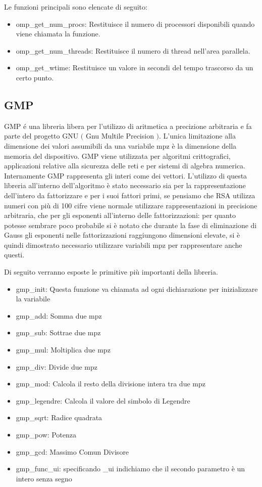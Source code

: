 Le funzioni principali sono elencate di seguito:
\begin{itemize}
\item omp\_get\_num\_procs: Restituisce il numero di processori disponibili quando viene chiamata la funzione. 
\item omp\_get\_num\_threads: Restituisce il numero di thread nell'area parallela.
\item omp\_get\_wtime: Restituisce un valore in secondi del tempo trascorso da un certo punto. 
\end{itemize}

\subsection{GMP}
\label{subsec:gmp}
GMP \'{e} una libreria libera per l'utilizzo di aritmetica a precizione arbitraria e fa parte
del progetto GNU $($ Gnu Multile Precision $)$.
L'unica limitazione alla dimensione dei valori assumibili da una variabile mpz è la dimensione della
memoria del dispositivo.
GMP viene utilizzata per algoritmi crittografici, applicazioni relative alla sicurezza delle reti
e per sistemi di algebra numerica.
Internamente GMP rappresenta gli interi come dei vettori.
L'utilizzo di questa libreria all'interno dell'algoritmo è stato necessario sia per la rappresentazione
dell'intero da fattorizzare e per i suoi fattori primi, se pensiamo che RSA utilizza numeri con più
di 100 cifre viene normale utilizzare rappresentazioni in precisione arbitraria, che per gli esponenti
all'interno delle fattorizzazioni: per quanto potesse sembrare poco probabile si è notato che durante la fase di eliminazione di Gauss gli esponenti nelle fattorizzazioni raggiungono dimensioni elevate, si è quindi dimostrato necessario utilizzare variabili
mpz per rappresentare anche questi.

Di seguito verranno esposte le primitive più importanti della libreria.
\begin{itemize}
\item gmp\_init: Questa funzione va chiamata ad ogni dichiarazione per inizializzare la variabile
\item gmp\_add: Somma due mpz
\item gmp\_sub: Sottrae due mpz
\item gmp\_mul: Moltiplica due mpz
\item gmp\_div: Divide due mpz
\item gmp\_mod: Calcola il resto della divisione intera tra due mpz
\item gmp\_legendre: Calcola il valore del simbolo di Legendre
\item gmp\_sqrt: Radice quadrata
\item gmp\_pow: Potenza
\item gmp\_gcd: Massimo Comun Divisore
\item gmp\_func\_ui: specificando \_ui indichiamo che il secondo parametro è un intero senza segno
\end{itemize}